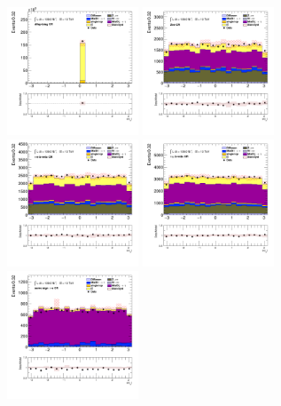 		\begin{figure}[!htp]
			\begin{center}    
			\includegraphics[width=0.35\textwidth]{chapters/chapter6_HPlus/images/taulep/tau_0_phi_DILEP_BTAG.png}
			\includegraphics[width=0.35\textwidth]{chapters/chapter6_HPlus/images/taulep/tau_0_phi_ZEE.png} \\
			\includegraphics[width=0.35\textwidth]{chapters/chapter6_HPlus/images/taulep/tau_0_phi_TAUEL_BVETO.png} 
			\includegraphics[width=0.35\textwidth]{chapters/chapter6_HPlus/images/taulep/tau_0_phi_TAUMU_BVETO.png} \\
			\includegraphics[width=0.35\textwidth]{chapters/chapter6_HPlus/images/taulep/tau_0_phi_SS_TAUEL.png} 

\end{center}
\end{figure}
